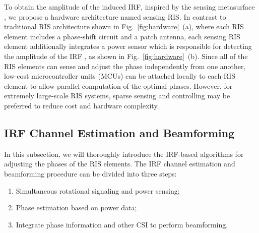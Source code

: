 \documentclass[journal,twocolumn]{IEEEtran}
\theoremstyle{nonumberplain}
\begin{document}
To obtain the amplitude of the induced \ac{IRF}, inspired by the sensing metasurface \cite{ma2019smart}, we propose a hardware architecture named sensing RIS.
In contrast to traditional RIS architecture shown in Fig.~\ref{fig:hardware}~(a), where each RIS element includes a phase-shift circuit and a patch antenna, each sensing RIS element additionally integrates a power sensor which is responsible for detecting the amplitude of the IRF \cite{ma2020smartsensing}, as shown in Fig.~\ref{fig:hardware}~(b).
Since all of the RIS elements can sense and adjust the phase independently from one another, low-cost microcontroller units (MCUs) can be attached locally to each RIS element to allow parallel computation of the optimal phases. 
However, for extremely large-scale RIS systems, sparse sensing and controlling may be preferred to reduce cost and hardware complexity. 

\subsection{IRF Channel Estimation and Beamforming} \label{IRF Channel Estimation and Beamforming}
    In this subsection, we will thoroughly introduce the IRF-based algorithms for adjusting the phases of the RIS elements. The \ac{IRF} channel estimation and beamforming procedure can be divided into three steps:
    \begin{enumerate}
        \item Simultaneous rotational signaling and power sensing; 
        \item Phase estimation based on power data;
        \item Integrate phase information and other CSI to perform beamforming. 
    \end{enumerate} 
\end{document}
